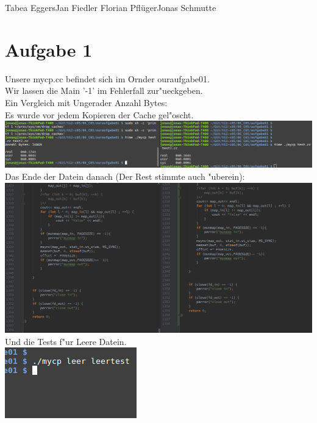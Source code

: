 \documentclass{ti2}
\begin{document}
%
                {Tabea Eggers}{Jan Fiedler}%
                {Florian Pflüger}{Jonas Schmutte}%


\section*{Aufgabe 1}
Unsere mycp.cc befindet sich im Ornder ouraufgabe01.\\
Wir lassen die Main '-1' im Fehlerfall zur"ueckgeben.\\

Ein Vergleich mit Ungerader Anzahl Bytes:\\
Es wurde vor jedem Kopieren der Cache gel"oscht.\\
\includegraphics[width=\textwidth]{ouraufgabe01/testungeradebytes.png}
Das Ende der Datein danach (Der Rest stimmte auch "uberein):\\
\includegraphics[width=\textwidth]{ouraufgabe01/vergleich.png}
Und die Tests f"ur Leere Datein.\\
\includegraphics[width=\textwidth]{ouraufgabe01/leertest.png}
\end{document}
